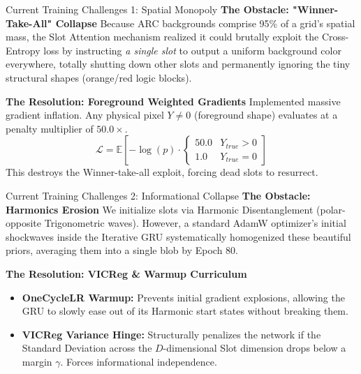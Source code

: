 \documentclass[aspectratio=169, 10pt]{beamer}
\begin{document}
\begin{frame}{Current Training Challenges 1: Spatial Monopoly}
    \textbf{The Obstacle: "Winner-Take-All" Collapse}
    Because ARC backgrounds comprise 95\% of a grid's spatial mass, the Slot Attention mechanism realized it could brutally exploit the Cross-Entropy loss by instructing \textit{a single slot} to output a uniform background color everywhere, totally shutting down other slots and permanently ignoring the tiny structural shapes (orange/red logic blocks).
    
    \vspace{0.2cm}
    \textbf{The Resolution: Foreground Weighted Gradients}
    Implemented massive gradient inflation. Any physical pixel $Y \neq 0$ (foreground shape) evaluates at a penalty multiplier of $50.0\times$. 
    \begin{equation}
        \mathcal{L} = \mathbb{E}\left[ -\log(p) \cdot \begin{cases} 50.0 & Y_{true} > 0 \\ 1.0 & Y_{true} = 0 \end{cases} \right] 
    \end{equation}
    This destroys the Winner-take-all exploit, forcing dead slots to resurrect.
\end{frame}

\begin{frame}{Current Training Challenges 2: Informational Collapse}
    \textbf{The Obstacle: Harmonics Erosion}
    We initialize slots via Harmonic Disentanglement (polar-opposite Trigonometric waves). However, a standard AdamW optimizer's initial shockwaves inside the Iterative GRU systematically homogenized these beautiful priors, averaging them into a single blob by Epoch 80.
    
    \vspace{0.2cm}
    \textbf{The Resolution: VICReg \& Warmup Curriculum}
    \begin{itemize}
        \item \textbf{OneCycleLR Warmup:} Prevents initial gradient explosions, allowing the GRU to slowly ease out of its Harmonic start states without breaking them.
        \item \textbf{VICReg Variance Hinge:} Structurally penalizes the network if the Standard Deviation across the $D$-dimensional Slot dimension drops below a margin $\gamma$. Forces informational independence.
    \end{itemize}
\end{frame}
\end{document}
